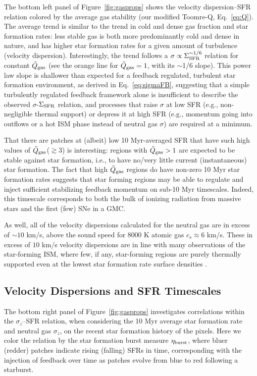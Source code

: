 \documentclass[usletter,fleqn,usenatbib]{mnras}
\begin{document}
The bottom left panel of Figure~\ref{fig:gasprops} shows the velocity dispersion--SFR relation colored by the average gas stability (our modified Toomre-Q, Eq.~\ref{eq:Q}).  The average trend is similar to the trend in cold and dense gas fraction and star formation rates: less stable gas is both more predominantly cold and dense in nature, and has higher star formation rates for a given amount of turbulence (velocity dispersion).  Interestingly, the trend follows a $\sigma \propto \Sigma_{\rm SFR}^{\sim 1/6}$ relation for constant $\tilde Q_{\rm gas}$ (see the orange line for $\tilde Q_{\rm gas} =1$, with its $\sim$1/6 slope).  This power law slope is shallower than expected for a feedback regulated, turbulent star formation environment, as derived in Eq.~\ref{eq:sigmaFB}, suggesting that a simple turbulently regulated feedback framework alone is insufficient to describe the observed $\sigma$-$\Sigma_{\rm SFR}$ relation, and processes that raise $\sigma$ at low SFR (e.g., non-negligible thermal support) or depress it at high SFR (e.g., momentum going into outflows or a hot ISM phase instead of neutral gas $\sigma$) are required at a minimum. 

That there are patches at (albeit) low 10 Myr-averaged SFR that have such high values of $\tilde Q_{\rm gas}$($\gtrsim 3$) is interesting: regions with $\tilde Q_{\rm gas}>1$ are expected to be stable against star formation, i.e., to have no/very little current (instantaneous) star formation.  The fact that high $\tilde Q_{\rm gas}$ regions do have non-zero 10 Myr star formation rates suggests that star forming regions may be able to regulate and inject sufficient stabilizing feedback momentum on sub-10 Myr timescales. Indeed, this timescale corresponds to both the bulk of ionizing radiation from massive stars and the first (few) SNe in a GMC.

As well, all of the velocity dispersions calculated for the neutral gas are in excess of $\sim 10$ km/s, above the sound speed for 8000 K atomic gas $c_s \approx 6$ km/s.  These in excess of $10$ km/s velocity dispersions are in line with many observations of the star-forming ISM, where few, if any, star-forming regions are purely thermally supported even at the lowest star formation rate surface densities \citep{Stilp2013, Stilp2013a}.

\subsection{Velocity Dispersions and SFR Timescales}
The bottom right panel of Figure~\ref{fig:gasprops} investigates correlations within the $\sigma_z$--SFR relation, when considering the 10 Myr average star formation rate and neutral gas $\sigma_z$, on the recent star formation history of the pixels.  Here we color the relation by the star formation burst measure $\eta_{\rm burst}$, where bluer (redder) patches indicate rising (falling) SFRs in time, corresponding with the injection of feedback over time as patches evolve from blue to red following a starburst. 
\end{document}

